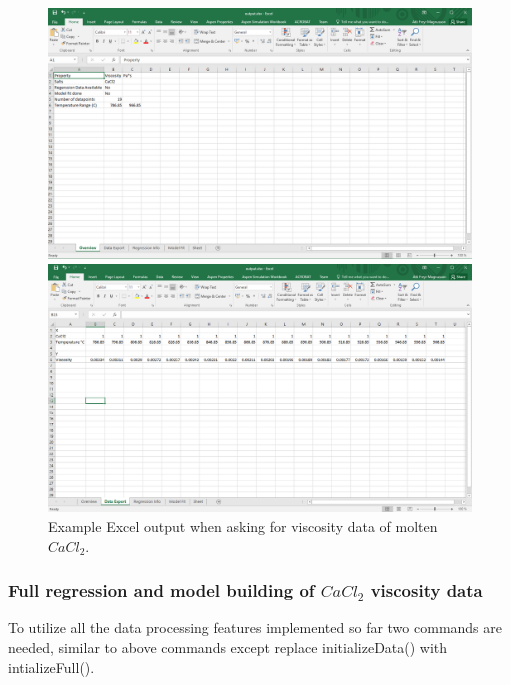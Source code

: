 \begin{figure}[h]
\centering
\begin{minipage}{0.5\textwidth}
  \centering
  \includegraphics[width=\linewidth]{msdf/figures/caclOverview.PNG}
\end{minipage}%
\begin{minipage}{0.5\textwidth}
  \centering
  \includegraphics[width=\linewidth]{msdf/figures/caclExport.PNG}
\end{minipage}
\caption{Example Excel output when asking for viscosity data of molten $CaCl_2$.}
\label{fig:caclExcel}
\end{figure}

\subsubsection{Full regression and model building of $CaCl_2$ viscosity data}
To utilize all the data processing features implemented so far two commands are needed, similar to above commands except replace initializeData() with intializeFull().

